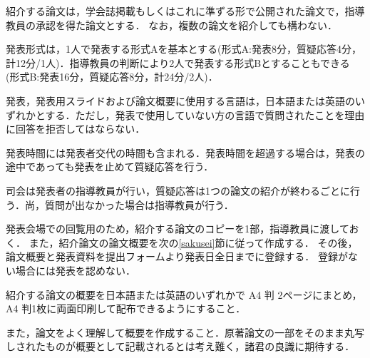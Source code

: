 \documentclass[10pt,a4j,uplatex,twoside]{jsarticle}
\begin{document}

    紹介する論文は，学会誌掲載もしくはこれに準ずる形で公開された論文で，指導教員の承認を得た論文とする． なお，複数の論文を紹介しても構わない．
 
    発表形式は，1人で発表する形式Aを基本とする(形式A:発表8分，質疑応答4分，計12分/1人)．指導教員の判断により2人で発表する形式Bとすることもできる (形式B:発表16分，質疑応答8分，計24分/2人)．
 
    発表，発表用スライドおよび論文概要に使用する言語は，日本語または英語のいずれかとする．ただし，発表で使用していない方の言語で質問されたことを理由に回答を拒否してはならない．

    発表時間には発表者交代の時間も含まれる．発表時間を超過する場合は，発表の途中であっても発表を止めて質疑応答を行う．

    司会は発表者の指導教員が行い，質疑応答は1つの論文の紹介が終わるごとに行う．尚，質問が出なかった場合は指導教員が行う．

    発表会場での回覧用のため，紹介する論文のコピーを1部，指導教員に渡しておく．
    また，紹介論文の論文概要を次の\ref{sakusei}節に従って作成する．
    その後，論文概要と発表資料を提出フォームより発表日全日までに登録する． 登録がない場合には発表を認めない．

\label{sakusei}
    紹介する論文の概要を日本語または英語のいずれかで A4 判 2ページにまとめ，A4 判1枚に両面印刷して配布できるようにすること．

    また，論文をよく理解して概要を作成すること．原著論文の一部をそのまま丸写しされたものが概要として記載されるとは考え難く，諸君の良識に期待する．
\end{document}
